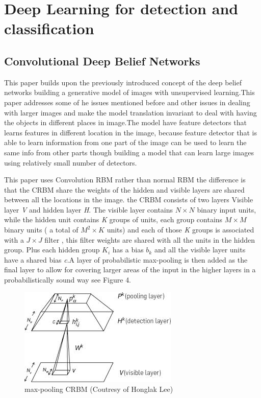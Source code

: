 \documentclass[12pt,twoside]{article}
\theoremstyle{plain}
\theoremstyle{definition}
\theoremstyle{remark}
\begin{document}
\section{Deep Learning for detection and classification}
\label{sec:DLDC}
\subsection{Convolutional Deep Belief Networks}
This paper \cite{Lee2009} builds upon the previously introduced concept of the deep belief networks building a generative model of images with unsupervised learning.This paper addresses some of he issues mentioned before and other issues in dealing with larger images and make the model translation invariant to deal with having the objects in different places in image.The model have feature detectors that learns features in different location in the image, because feature detector that is able to learn information from one part of the image can be used to learn the same info from other parts though building a model that can learn large images using relatively small number of detectors.

This paper uses Convolution RBM rather than normal RBM the difference is that the CRBM share the weights of the hidden and visible layers are shared between all the locations in the image.
the CRBM consists of two layers Visible layer \textit{V} and hidden layer \textit{H}. The visible layer contains $ N \times N $ binary input units, while the hidden unit contains \textit{K} groups of units, each group contains $ M \times M $ binary units ( a total of $ M^2 \times K$ units) and each of those \textit{K} groups is associated with a $ J \times J $ filter , this filter weights are shared with all the units in the hidden group. Plus each hidden group $ K _{i} $ has a bias $ b _{k} $  and all the visible layer units have a shared bias \textit{c}.A layer of probabilistic max-pooling is then added as the final layer to allow for covering larger areas of the input in the higher layers in a probabilistically sound way see Figure 4.

\begin{figure}[hbtp]
\centering
\includegraphics[scale=1]{Images/images.jpg}
\caption{max-pooling CRBM (Coutresy of Honglak Lee)}
\end{figure}
\end{document}
